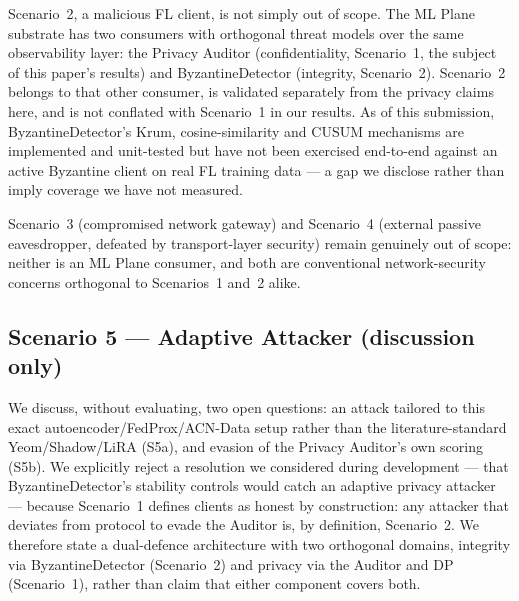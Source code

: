 Scenario~2, a malicious FL client, is not simply out of scope. The ML Plane
substrate has two consumers with orthogonal threat models over the same
observability layer: the Privacy Auditor (confidentiality, Scenario~1, the
subject of this paper's results) and ByzantineDetector (integrity,
Scenario~2). Scenario~2 belongs to that other consumer, is validated
separately from the privacy claims here, and is not conflated with
Scenario~1 in our results. As of this submission, ByzantineDetector's
Krum, cosine-similarity and CUSUM mechanisms are implemented and unit-tested
but have not been exercised end-to-end against an active Byzantine client on
real FL training data --- a gap we disclose rather than imply coverage we
have not measured.

Scenario~3 (compromised network gateway) and Scenario~4 (external passive
eavesdropper, defeated by transport-layer security) remain genuinely out of
scope: neither is an ML Plane consumer, and both are conventional
network-security concerns orthogonal to Scenarios~1 and~2 alike.

\subsection{Scenario 5 --- Adaptive Attacker (discussion only)}
\label{sec:threat-s5}

We discuss, without evaluating, two open questions: an attack tailored to
this exact autoencoder/FedProx/ACN-Data setup rather than the
literature-standard Yeom/Shadow/LiRA (S5a), and evasion of the Privacy
Auditor's own scoring (S5b). We explicitly reject a resolution we considered
during development --- that ByzantineDetector's stability controls would
catch an adaptive privacy attacker --- because Scenario~1 defines clients as
honest by construction: any attacker that deviates from protocol to evade
the Auditor is, by definition, Scenario~2. We therefore state a dual-defence
architecture with two orthogonal domains, integrity via ByzantineDetector
(Scenario~2) and privacy via the Auditor and DP (Scenario~1), rather than
claim that either component covers both.
